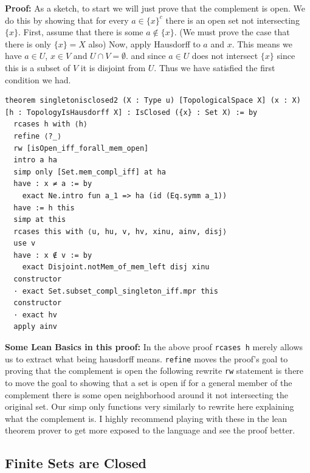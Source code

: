 \documentclass[11pt]{article}
\begin{document}

\textbf{Proof:} As a sketch, to start we will just prove that the complement is open. We do this by showing that for every $a \in \{x\}^c$ there is an open set not intersecting $\{x\}$. First, assume that there is some $a \not \in \{x\}$. (We must prove the case that there is only $\{x\} = X$ also) Now, apply Hausdorff to $a$ and $x$. This means we have $a \in U$, $x \in V$ and $U \cap V = \emptyset$. and since $a \in U$ does not intersect $\{x\}$ since this is a subset of $V$ it is disjoint from $U$. Thus we have satisfied the first condition we had. 

\begin{verbatim}
theorem singletonisclosed2 (X : Type u) [TopologicalSpace X] (x : X) [h : TopologyIsHausdorff X] : IsClosed ({x} : Set X) := by
  rcases h with ⟨h⟩
  refine ⟨?_⟩
  rw [isOpen_iff_forall_mem_open]
  intro a ha
  simp only [Set.mem_compl_iff] at ha 
  have : x ≠ a := by 
    exact Ne.intro fun a_1 => ha (id (Eq.symm a_1))
  have := h this
  simp at this
  rcases this with ⟨u, hu, v, hv, xinu, ainv, disj⟩ 
  use v 
  have : x ∉ v := by 
    exact Disjoint.notMem_of_mem_left disj xinu
  constructor
  · exact Set.subset_compl_singleton_iff.mpr this
  constructor
  · exact hv
  apply ainv
\end{verbatim}


\medskip
\noindent
\textbf{Some Lean Basics in this proof:} In the above proof \verb|rcases h| merely allows us to extract what being hausdorff means. \verb|refine| moves the proof's goal to proving that the complement is open the following rewrite \verb|rw| statement is there to move the goal to showing that a set is open if for a general member of the complement there is some open neighborhood around it not intersecting the original set. Our simp only functions very similarly to rewrite here explaining what the complement is. I highly recommend playing with these in the lean theorem prover to get more exposed to the language and see the proof better.  

\subsection{Finite Sets are Closed}
\end{document}
